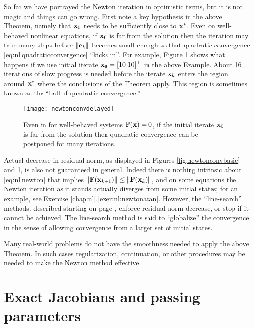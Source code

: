 So far we have portrayed the Newton iteration in optimistic terms, but it is not magic and things can go wrong.  First note a key hypothesis in the above Theorem, namely that $\mathbf{x}_0$ needs to be sufficiently close to $\mathbf{x}^*$.  Even on well-behaved nonlinear equations, if $\mathbf{x}_0$ is far from the solution then the iteration may take many steps before $\|\mathbf{e}_k\|$ becomes small enough so that quadratic convergence \eqref{eq:nl:quadraticconvergence} ``kicks in''.  For example, Figure \ref{fig:newtonconvdelayed} shows what happens if we use initial iterate $\mathbf{x}_0=[10\,\, 10]^\top$ in the above Example.  About 16 iterations of slow progress is needed before the iterate $\mathbf{x}_k$ enters the region around $\mathbf{x}^*$ where the conclusions of the Theorem apply.  This region is sometimes known as the ``ball of quadratic convergence.''

\begin{figure}
\texttt{[image: newtonconvdelayed]}
\caption{Even in for well-behaved systems $\mathbf{F}(\mathbf{x})=0$, if the initial iterate $\mathbf{x}_0$ is far from the solution then quadratic convergence can be postponed for many iterations.}
\label{fig:newtonconvdelayed}
\end{figure}

Actual decrease in residual norm, as displayed in Figures \ref{fig:newtonconvbasic} and \ref{fig:newtonconvdelayed}, is also not guaranteed in general.  Indeed there is nothing intrinsic about \eqref{eq:nl:newton} that implies $\|\mathbf{F}(\mathbf{x}_{k+1})\| \le \|\mathbf{F}(\mathbf{x}_k)\|$, and on some equations the Newton iteration as it stands actually diverges from some initial states; for an example, see Exercise \ref{chap:nl}.\ref{exer:nl:newtonatan}.  However, the ``line-search'' methods, described starting on page \pageref{sec:linesearch}, enforce residual norm decrease, or stop if it cannot be achieved.  The line-search method is said to ``globalize'' the convergence \citep{Kelley2003} in the sense of allowing convergence from a larger set of initial states.

Many real-world problems do not have the smoothness needed to apply the above Theorem.  In such cases regularization, continuation, or other procedures may be needed to make the Newton method effective.


\section{Exact Jacobians and passing parameters}

